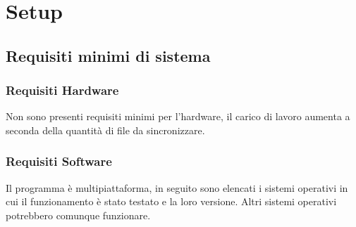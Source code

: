 \section{Setup}

\subsection{Requisiti minimi di sistema}

\subsubsection{Requisiti Hardware}
Non sono presenti requisiti minimi per l'hardware, il carico di lavoro aumenta a seconda della quantità di file da sincronizzare.

\subsubsection{Requisiti Software}

Il programma è multipiattaforma, in seguito sono elencati i sistemi operativi in cui il funzionamento è stato testato e la loro versione. Altri sistemi operativi potrebbero comunque funzionare.

